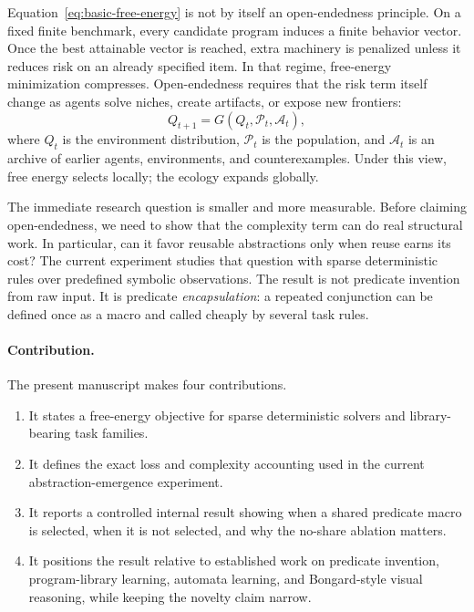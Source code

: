 \documentclass[11pt]{article}
\begin{document}
Equation~\ref{eq:basic-free-energy} is not by itself an open-endedness
principle. On a fixed finite benchmark, every candidate program induces a finite
behavior vector. Once the best attainable vector is reached, extra machinery is
penalized unless it reduces risk on an already specified item. In that regime,
free-energy minimization compresses. Open-endedness requires that the risk term
itself change as agents solve niches, create artifacts, or expose new
frontiers:
\begin{equation}
  Q_{t+1}=G(Q_t,\mathcal{P}_t,\mathcal{A}_t),
  \label{eq:ecology}
\end{equation}
where $Q_t$ is the environment distribution, $\mathcal{P}_t$ is the population,
and $\mathcal{A}_t$ is an archive of earlier agents, environments, and
counterexamples. Under this view, free energy selects locally; the ecology
expands globally.

The immediate research question is smaller and more measurable. Before claiming
open-endedness, we need to show that the complexity term can do real structural
work. In particular, can it favor reusable abstractions only when reuse earns
its cost? The current experiment studies that question with sparse deterministic
rules over predefined symbolic observations. The result is not predicate
invention from raw input. It is predicate \emph{encapsulation}: a repeated
conjunction can be defined once as a macro and called cheaply by several task
rules.

\paragraph{Contribution.}
The present manuscript makes four contributions.
\begin{enumerate}[leftmargin=1.5em]
  \item It states a free-energy objective for sparse deterministic solvers and
  library-bearing task families.
  \item It defines the exact loss and complexity accounting used in the current
  abstraction-emergence experiment.
  \item It reports a controlled internal result showing when a shared predicate
  macro is selected, when it is not selected, and why the no-share ablation
  matters.
  \item It positions the result relative to established work on predicate
  invention, program-library learning, automata learning, and Bongard-style
  visual reasoning, while keeping the novelty claim narrow.
\end{enumerate}
\end{document}
